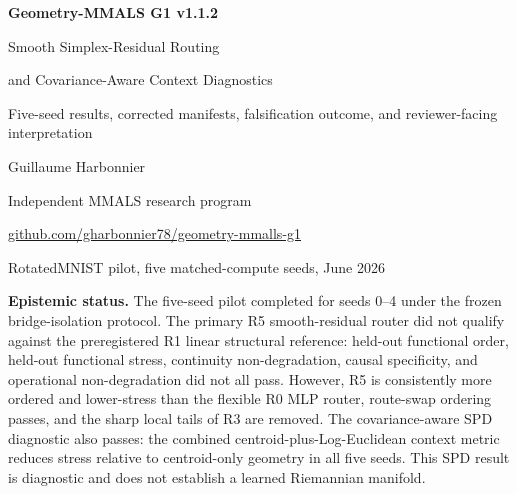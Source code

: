 \documentclass[11pt,a4paper]{article}
\begin{document}
\begin{titlepage}
\centering
\vspace*{0.4cm}
{\Huge\bfseries\color{deepblue} Geometry-MMALS G1 v1.1.2\par}
\vspace{0.25cm}
{\LARGE Smooth Simplex-Residual Routing\par}
\vspace{0.08cm}
{\LARGE and Covariance-Aware Context Diagnostics\par}
\vspace{0.45cm}
{\Large Five-seed results, corrected manifests, falsification outcome, and reviewer-facing interpretation\par}
\vspace{0.7cm}
{\Large Guillaume Harbonnier\par}
\vspace{0.15cm}
{\normalsize Independent MMALS research program\par}
\vspace{0.15cm}
{\normalsize \href{https://github.com/gharbonnier78/geometry-mmalls-g1}{github.com/gharbonnier78/geometry-mmalls-g1}\par}
\vspace{0.55cm}
{\normalsize RotatedMNIST pilot, five matched-compute seeds, June 2026\par}
\vfill
\begin{minipage}{0.94\textwidth}\small
\textbf{Epistemic status.} The five-seed pilot completed for seeds 0--4 under the frozen bridge-isolation protocol. The primary R5 smooth-residual router did not qualify against the preregistered R1 linear structural reference: held-out functional order, held-out functional stress, continuity non-degradation, causal specificity, and operational non-degradation did not all pass. However, R5 is consistently more ordered and lower-stress than the flexible R0 MLP router, route-swap ordering passes, and the sharp local tails of R3 are removed. The covariance-aware SPD diagnostic also passes: the combined centroid-plus-Log-Euclidean context metric reduces stress relative to centroid-only geometry in all five seeds. This SPD result is diagnostic and does not establish a learned Riemannian manifold.
\end{minipage}
\vfill
\end{titlepage}
\end{document}
